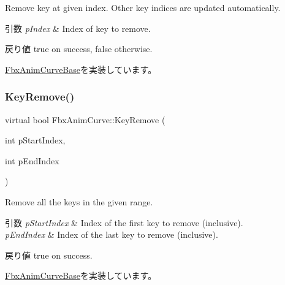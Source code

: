 Remove key at given index. Other key indices are updated automatically. 
\begin{DoxyParams}{引数}
{\em p\+Index} & Index of key to remove. \\
\hline
\end{DoxyParams}
\begin{DoxyReturn}{戻り値}
{\ttfamily true} on success, {\ttfamily false} otherwise. 
\end{DoxyReturn}


\hyperlink{class_fbx_anim_curve_base_a4d7d1bbd3d40020469aafd7c023f80d5}{Fbx\+Anim\+Curve\+Base}を実装しています。

\mbox{\label{class_fbx_anim_curve_a7b4fe494d1ca4575bb253ec89f867df1}} 
\subsubsection{\texorpdfstring{Key\+Remove()}{KeyRemove()}\hspace{0.1cm}{\footnotesize\ttfamily [2/2]}}
{\footnotesize\ttfamily virtual bool Fbx\+Anim\+Curve\+::\+Key\+Remove (\begin{DoxyParamCaption}\item[{int}]{p\+Start\+Index,  }\item[{int}]{p\+End\+Index }\end{DoxyParamCaption})\hspace{0.3cm}{\ttfamily [pure virtual]}}

Remove all the keys in the given range. 
\begin{DoxyParams}{引数}
{\em p\+Start\+Index} & Index of the first key to remove (inclusive). \\
\hline
{\em p\+End\+Index} & Index of the last key to remove (inclusive). \\
\hline
\end{DoxyParams}
\begin{DoxyReturn}{戻り値}
true on success. 
\end{DoxyReturn}


\hyperlink{class_fbx_anim_curve_base_a2813321af80c66758eb9fbe025fd52ea}{Fbx\+Anim\+Curve\+Base}を実装しています。

\mbox{\label{class_fbx_anim_curve_a5422351a86bda5b21e6ed5ce6658477e}} 
